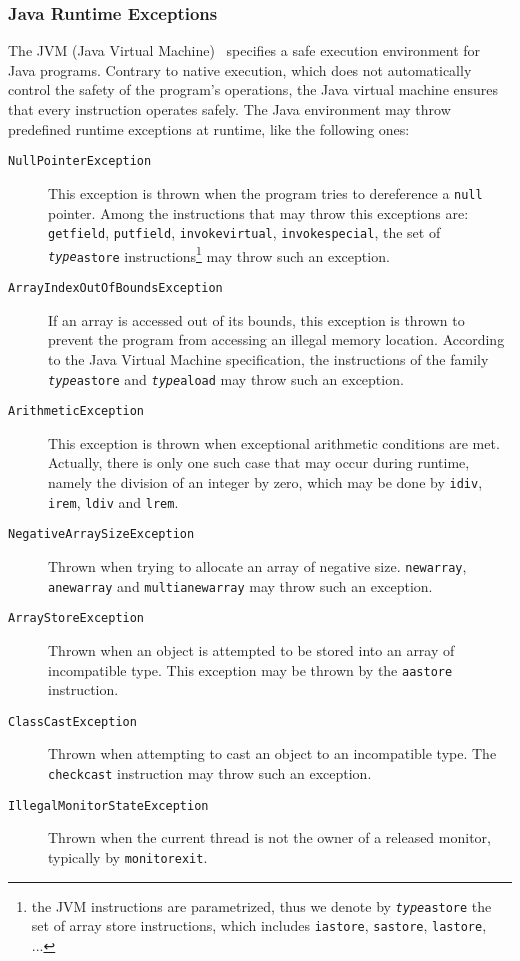 \subsubsection{Java Runtime Exceptions}
\label{sec:runtimeexceptions}
The JVM (Java Virtual Machine)~\cite{VMSpec} specifies a safe execution environment for Java programs. Contrary to native execution, which does not automatically control the safety of the program's operations, the Java virtual machine ensures that every instruction operates safely. The Java environment may throw predefined runtime exceptions at runtime, like the following ones:

\begin{description}
\item[\texttt{NullPointerException}]
This exception is thrown when the program tries to dereference a \texttt{null} pointer. Among the instructions
that may throw this exceptions are: \texttt{getfield}, \texttt{putfield}, \texttt{invokevirtual}, \texttt{invokespecial}, the set of  \texttt{\emph{type}astore} instructions\footnote{the JVM instructions are parametrized, thus we denote by \texttt{\emph{type}astore} the set of array store instructions, which includes \texttt{iastore}, \texttt{sastore}, \texttt{lastore}, ...} may throw such an exception.
\item[\texttt{ArrayIndexOutOfBoundsException}] If an array is accessed out of its bounds, this exception is thrown to prevent the program from accessing an illegal memory location. According to the Java Virtual Machine specification, the instructions of the family \texttt{\emph{type}astore} and \texttt{\emph{type}aload} may throw such an exception.
\item[\texttt{ArithmeticException}] This exception is thrown when exceptional arithmetic conditions are met. Actually, there is only one such case that may occur during runtime, namely the division of an integer by zero, which may be done by \texttt{idiv}, \texttt{irem}, \texttt{ldiv} and \texttt{lrem}.
\item[\texttt{NegativeArraySizeException}] Thrown when trying to allocate an array of negative size. \texttt{newarray}, \texttt{anewarray} and \texttt{multianewarray} may throw such an exception.
\item[\texttt{ArrayStoreException}] Thrown when an object is attempted to be stored into an array of incompatible type. This exception may be thrown by the \texttt{aastore} instruction.
\item[\texttt{ClassCastException}] Thrown when attempting to cast an object to an incompatible type. The \texttt{checkcast} instruction may throw such an exception.
\item[\texttt{IllegalMonitorStateException}] Thrown when the current thread is not the owner of a released monitor, typically by \texttt{monitorexit}.

\end{description}

